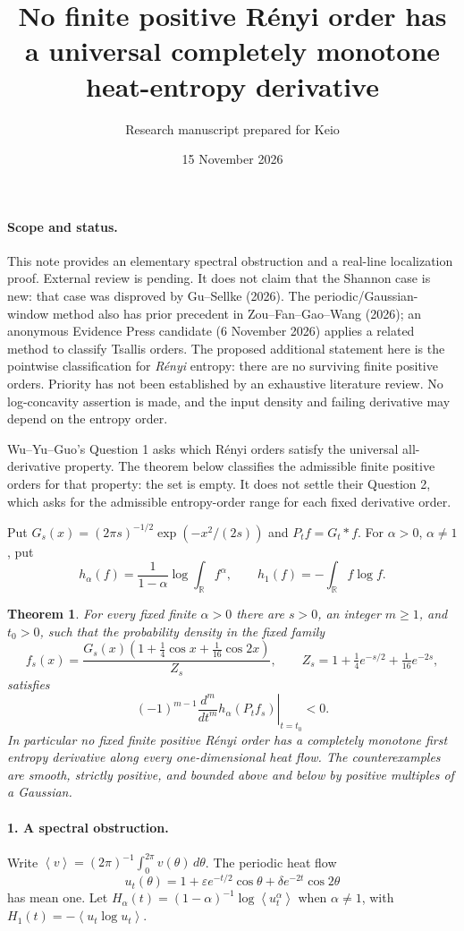 \documentclass[11pt]{article}
\title{No finite positive R\'enyi order has a universal completely monotone heat-entropy derivative}
\author{Research manuscript prepared for Keio}
\date{15 November 2026}
\newtheorem{theorem}{Theorem}
\newcommand{\av}[1]{\left\langle #1\right\rangle}
\newcommand{\R}{\mathbb R}
\begin{document}
\maketitle

\paragraph{Scope and status.}
This note provides an elementary spectral obstruction and a real-line localization proof. External review is pending. It does not claim that the Shannon case is new: that case was disproved by Gu--Sellke (2026). The periodic/Gaussian-window method also has prior precedent in Zou--Fan--Gao--Wang (2026); an anonymous Evidence Press candidate (6 November 2026) applies a related method to classify Tsallis orders. The proposed additional statement here is the pointwise classification for \emph{R\'enyi} entropy: there are no surviving finite positive orders. Priority has not been established by an exhaustive literature review. No log-concavity assertion is made, and the input density and failing derivative may depend on the entropy order.

Wu--Yu--Guo's Question 1 asks which R\'enyi orders satisfy the universal all-derivative property. The theorem below classifies the admissible finite positive orders for that property: the set is empty. It does not settle their Question 2, which asks for the admissible entropy-order range for each fixed derivative order.

Put $G_s(x)=(2\pi s)^{-1/2}\exp(-x^2/(2s))$ and $P_t f=G_t*f$. For $\alpha>0$, $\alpha\ne1$, put
\[
 h_\alpha(f)=\frac{1}{1-\alpha}\log\int_\R f^\alpha,
 \qquad h_1(f)=-\int_\R f\log f.
\]

\begin{theorem}\label{thm:main}
For every fixed finite $\alpha>0$ there are $s>0$, an integer $m\ge1$, and $t_0>0$, such that the probability density in the fixed family
\[
 f_s(x)=\frac{G_s(x)(1+\tfrac14\cos x+\tfrac1{16}\cos2x)}{Z_s},
 \qquad Z_s=1+\tfrac14 e^{-s/2}+\tfrac1{16}e^{-2s},
\]
satisfies
\[
 (-1)^{m-1}\left.\frac{d^m}{dt^m}h_\alpha(P_t f_s)\right|_{t=t_0}<0.
\]
In particular no fixed finite positive R\'enyi order has a completely monotone first entropy derivative along every one-dimensional heat flow. The counterexamples are smooth, strictly positive, and bounded above and below by positive multiples of a Gaussian.
\end{theorem}

\paragraph{1. A spectral obstruction.}
Write $\av v=(2\pi)^{-1}\int_0^{2\pi}v(\theta)\,d\theta$. The periodic heat flow
\[
 u_t(\theta)=1+\varepsilon e^{-t/2}\cos\theta+\delta e^{-2t}\cos2\theta
\]
has mean one. Let $H_\alpha(t)=(1-\alpha)^{-1}\log\av{u_t^\alpha}$ when $\alpha\ne1$, with $H_1(t)=-\av{u_t\log u_t}$.
\end{document}
